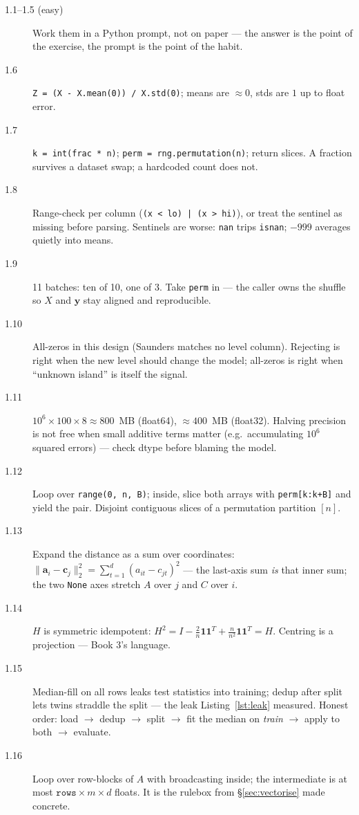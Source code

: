 \begin{description}
\item[1.1--1.5 (easy)] Work them in a Python prompt, not on paper --- the
  answer is the point of the exercise, the prompt is the point of the habit.
\item[1.6] \texttt{Z = (X - X.mean(0)) / X.std(0)}; means are $\approx0$,
  stds are $1$ up to float error.
\item[1.7] \texttt{k = int(frac * n)}; \texttt{perm = rng.permutation(n)};
  return slices. A fraction survives a dataset swap; a hardcoded count does
  not.
\item[1.8] Range-check per column (\texttt{(x < lo) | (x > hi)}), or treat the
  sentinel as missing before parsing. Sentinels are worse: \texttt{nan}
  trips \texttt{isnan}; $-999$ averages quietly into means.
\item[1.9] 11 batches: ten of 10, one of 3. Take \texttt{perm} in --- the
  caller owns the shuffle so $X$ and $\mathbf y$ stay aligned and
  reproducible.
\item[1.10] All-zeros in this design (Saunders matches no level column).
  Rejecting is right when the new level should change the model; all-zeros is
  right when ``unknown island'' is itself the signal.
\item[1.11] $10^6\times100\times8 \approx 800$~MB (float64), $\approx 400$~MB
  (float32). Halving precision is not free when small additive terms matter
  (e.g.\ accumulating $10^6$ squared errors) --- check dtype before blaming
  the model.
\item[1.12] Loop over \texttt{range(0, n, B)}; inside, slice both arrays with
  \texttt{perm[k:k+B]} and yield the pair. Disjoint contiguous slices of a
  permutation partition $[n]$.
\item[1.13] Expand the distance as a sum over coordinates: $\|\mathbf
  a_i-\mathbf c_j\|_2^2 = \sum_{t=1}^{d}(a_{it}-c_{jt})^2$ --- the last-axis
  sum \emph{is} that inner sum; the two \texttt{None} axes stretch $A$ over
  $j$ and $C$ over $i$.
\item[1.14] $H$ is symmetric idempotent: $H^2 = I - \frac2n\mathbf 1\mathbf
  1^T + \frac{n}{n^2}\mathbf 1\mathbf 1^T = H$. Centring is a projection ---
  Book 3's language.
\item[1.15] Median-fill on all rows leaks test statistics into training;
  dedup after split lets twins straddle the split --- the leak
  Listing~\ref{lst:leak} measured. Honest order: load $\to$ dedup $\to$ split
  $\to$ fit the median on \emph{train} $\to$ apply to both $\to$ evaluate.
\item[1.16] Loop over row-blocks of $A$ with broadcasting inside; the
  intermediate is at most $\texttt{rows}\times m\times d$ floats. It is the
  rulebox from \S\ref{sec:vectorise} made concrete.
\end{description}
